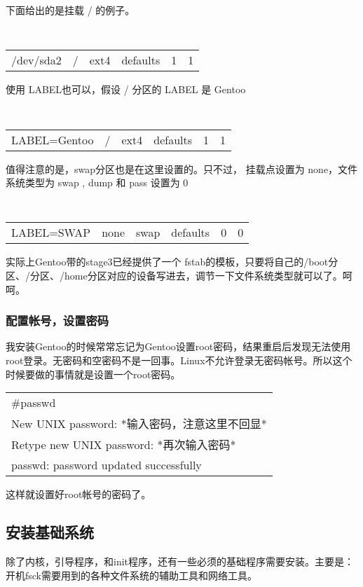 \documentclass[amstex,twoside]{ctexbook}
\newenvironment{code}{\small\tt\begin{longtable}{p{0.8\textwidth}}}{\end{longtable}}
\begin{document}
下面给出的是挂载 / 的例子。
\begin{small}
\tt 
\begin{longtable}{cccccc}
/dev/sda2	& /	 & ext4	& defaults & 1 & 1
\end{longtable}
\end{small}

使用 LABEL也可以，假设 / 分区的 LABEL 是 Gentoo

\begin{small}
\tt 
\begin{longtable}{cccccc}
LABEL=Gentoo	& /	 & ext4	& defaults & 1 & 1
\end{longtable}
\end{small}

值得注意的是，swap分区也是在这里设置的。只不过， 挂载点设置为 none，文件系统类型为 swap , dump 和 pass 设置为 0 

\begin{small}
\tt 
\begin{longtable}{cccccc}
LABEL=SWAP	& none	 & swap	& defaults & 0 & 0
\end{longtable}
\end{small}

实际上Gentoo带的stage3已经提供了一个 fstab的模板，只要将自己的/boot分区、/分区、/home分区对应的设备写进去，调节一下文件系统类型就可以了。呵呵。


\subsubsection{配置帐号，设置密码}

我安装Gentoo的时候常常忘记为Gentoo设置root密码，结果重启后发现无法使用root登录。无密码和空密码不是一回事。Linux不允许登录无密码帐号。所以这个时候要做的事情就是设置一个root密码。

\begin{code}
\#passwd\\
New UNIX password: *输入密码，注意这里不回显*\\
Retype new UNIX password: *再次输入密码*\\
passwd: password updated successfully
\end{code}

这样就设置好root帐号的密码了。

\subsection{安装基础系统}

除了内核，引导程序，和init程序，还有一些必须的基础程序需要安装。主要是：开机fsck需要用到的各种文件系统的辅助工具和网络工具。
\end{document}
